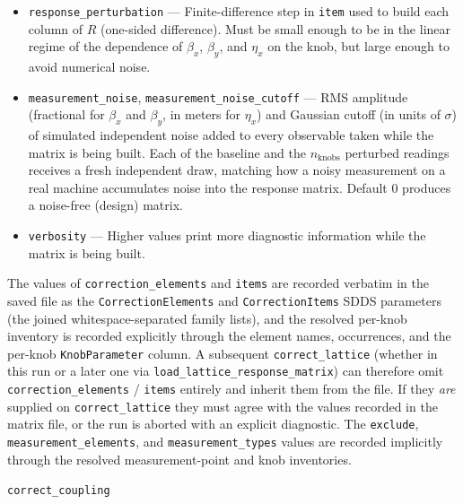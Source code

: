 \documentclass[11pt]{article}
\begin{document}
\begin{itemize}
  type matches \verb|measurement_types[i]|.  
  measured via LOCO).  For example, the default values are
  \verb|measurement_elements="* * *"|,
  \verb|measurement_types="MONI HMON VMON"|, which selects all monitor
  elements of any of the three types; whereas
  \verb|measurement_elements="*"|, \verb|measurement_types="*QUAD*"|
  selects every quadrupole element.
\item \verb|response_perturbation| --- Finite-difference step in \verb|item|
  used to build each column of $R$ (one-sided difference).  Must be small
  enough to be in the linear regime of the dependence of $\beta_x$, $\beta_y$,
  and $\eta_x$ on the knob, but large enough to avoid numerical noise.
\item \verb|measurement_noise|, \verb|measurement_noise_cutoff| --- RMS
  amplitude (fractional for $\beta_x$ and $\beta_y$, in meters for 
  $\eta_x$) and Gaussian cutoff (in units of $\sigma$)
  of simulated independent noise added to every observable taken while the
  matrix is being built.  Each of the baseline and the $n_{\mathrm{knobs}}$
  perturbed readings receives a fresh independent draw, matching how a noisy
  measurement on a real machine accumulates noise into the response matrix.
  Default 0 produces a noise-free (design) matrix.
\item \verb|verbosity| --- Higher values print more diagnostic information
  while the matrix is being built.
\end{itemize}

The values of \verb|correction_elements| and \verb|items| are recorded
verbatim in the saved file as the \verb|CorrectionElements| and
\verb|CorrectionItems| SDDS parameters (the joined whitespace-separated
family lists), and the resolved per-knob inventory is recorded
explicitly through the element names, occurrences, and the per-knob
\verb|KnobParameter| column.  A subsequent \verb|correct_lattice|
(whether in this run or a later one via \verb|load_lattice_response_matrix|)
can therefore omit \verb|correction_elements| / \verb|items| entirely
and inherit them from the file.  If they {\em are} supplied on
\verb|correct_lattice| they must agree with the values recorded in the
matrix file, or the run is aborted with an explicit diagnostic.  The
\verb|exclude|, \verb|measurement_elements|, and
\verb|measurement_types| values are recorded implicitly through the
resolved measurement-point and knob inventories.

\newpage
\begin{center}{\Large\verb|correct_coupling|}\end{center}
\end{document}

